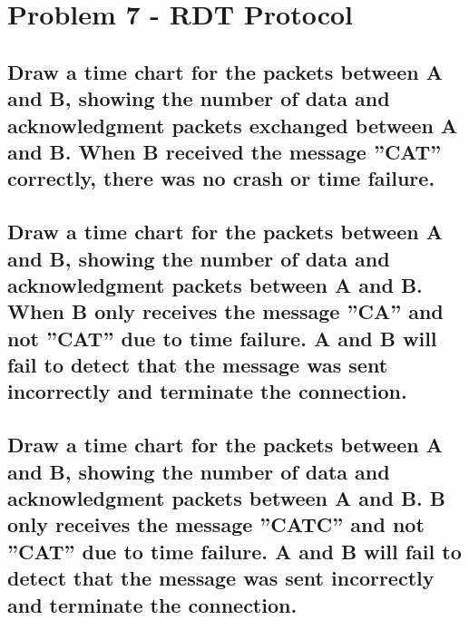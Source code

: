 \documentclass{article}
\begin{document}
\section{Problem 7 - RDT Protocol}

\subsection{Draw a time chart for the packets between A and B, showing the number of
data and acknowledgment packets exchanged between A and B. When B received the
message ”CAT” correctly, there was no crash or time failure.}

\subsection{Draw a time chart for the packets between A and B, showing the number of
data and acknowledgment packets between A and B. When B only receives the message
”CA” and not ”CAT” due to time failure. A and B will fail to detect that the message
was sent incorrectly and terminate the connection.}

\subsection{Draw a time chart for the packets between A and B, showing the number of
data and acknowledgment packets between A and B. B only receives the message ”CATC”
and not ”CAT” due to time failure. A and B will fail to detect that the message was sent
incorrectly and terminate the connection.}
\end{document}
